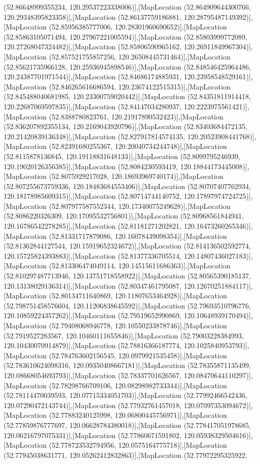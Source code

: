 (52.86648999355234, 120.29537223338006)],[MapLocation (52.864909644300766, 120.29348395823358)],[MapLocation (52.86137759186881, 120.28795487149392)],[MapLocation (52.85956385777006, 120.28301960690652)],[MapLocation (52.85863105071494, 120.27967221005594)],[MapLocation (52.85803999772089, 120.27268047324482)],[MapLocation (52.85806590965162, 120.26911849967304)],[MapLocation (52.857521755857256, 120.26508445731464)],[MapLocation (52.85621735966128, 120.25936945898546)],[MapLocation (52.848546425964486, 120.24387701971544)],[MapLocation (52.84686174885931, 120.23958548529161)],[MapLocation (52.846265616686594, 120.23674122515315)],[MapLocation (52.845488040681985, 120.23300759020442)],[MapLocation (52.84351811914418, 120.22687069597835)],[MapLocation (52.84147034280937, 120.2223975561421)],[MapLocation (52.8388780823761, 120.21917890532423)],[MapLocation (52.836207892355134, 120.2169043920796)],[MapLocation (52.83403684472135, 120.21420839136348)],[MapLocation (52.827917814574135, 120.20523908441768)],[MapLocation (52.82391680255367, 120.20040734244748)],[MapLocation (52.8115878136845, 120.19118831648133)],[MapLocation (52.8099795246939, 120.19020126356385)],[MapLocation (52.8084230593419, 120.18844173445008)],[MapLocation (52.8075929217028, 120.18693969740174)],[MapLocation (52.807255673759336, 120.18483684553406)],[MapLocation (52.80707407762934, 120.18178985609315)],[MapLocation (52.80714744140752, 120.17897974724725)],[MapLocation (52.807977587552344, 120.17340075249628)],[MapLocation (52.8086220326309, 120.17095532756801)],[MapLocation (52.80968561844941, 120.16786542278285)],[MapLocation (52.81181271202821, 120.16473260265346)],[MapLocation (52.81331717879086, 120.16078439098354)],[MapLocation (52.81362844127544, 120.15919652324672)],[MapLocation (52.814136502592774, 120.15725824393883)],[MapLocation (52.81377336705514, 120.14807436027183)],[MapLocation (52.813306474049114, 120.14515611686363)],[MapLocation (52.810297487713946, 120.13751718558922)],[MapLocation (52.80565390185137, 120.13138029136314)],[MapLocation (52.80347461795087, 120.12670251884117)],[MapLocation (52.80134711640869, 120.11807653464928)],[MapLocation (52.798751458576604, 120.11206838645592)],[MapLocation (52.79693510796776, 120.10859224357262)],[MapLocation (52.79519652990869, 120.10648939170494)],[MapLocation (52.79408068946778, 120.10550233878746)],[MapLocation (52.7919527283567, 120.10460111655846)],[MapLocation (52.79003228384993, 120.10430070914879)],[MapLocation (52.78816366187774, 120.1025840953793)],[MapLocation (52.784763602156545, 120.0979921535458)],[MapLocation (52.783610624098316, 120.09350408667181)],[MapLocation (52.78355871135499, 120.08668054693793)],[MapLocation (52.78337701626567, 120.08470644110297)],[MapLocation (52.78298766709106, 120.08298982733344)],[MapLocation (52.78114470039593, 120.07715334051703)],[MapLocation (52.77992466542436, 120.07290472143744)],[MapLocation (52.77932761457018, 120.07097353094672)],[MapLocation (52.77883240125998, 120.06800445756971)],[MapLocation (52.77859876777697, 120.06628784380018)],[MapLocation (52.778417051978685, 120.06216797075331)],[MapLocation (52.77860671591802, 120.05938329504616)],[MapLocation (52.778723532794956, 120.0575164775718)],[MapLocation (52.77945038631771, 120.05262412832863)],[MapLocation (52.77972295325922, 